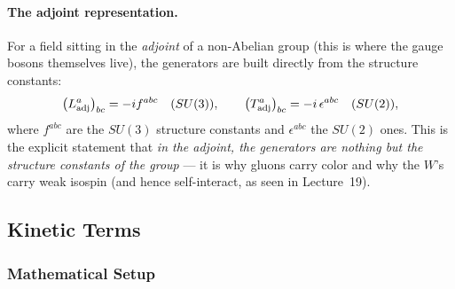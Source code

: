 \paragraph{The adjoint representation.}
For a field sitting in the \emph{adjoint} of a non-Abelian group (this
is where the gauge bosons themselves live), the generators are built
directly from the structure constants:
\begin{equation}
  \bigl(L^a_{\rm adj}\bigr)_{bc} = -i f^{abc}\quad(SU(3)),
  \qquad
  \bigl(T^a_{\rm adj}\bigr)_{bc} = -i\,\epsilon^{abc}\quad(SU(2)),
  \label{eq:lec20:adjoint}
\end{equation}
where $f^{abc}$ are the $SU(3)$ structure constants and
$\epsilon^{abc}$ the $SU(2)$ ones. This is the explicit statement that
\emph{in the adjoint, the generators are nothing but the structure
constants of the group} --- it is why gluons carry color and why the
$W$'s carry weak isospin (and hence self-interact, as seen in
Lecture~19).

\subsection{Kinetic Terms}\label{subsec:lec20:kinetic}

\subsubsection*{Mathematical Setup}

